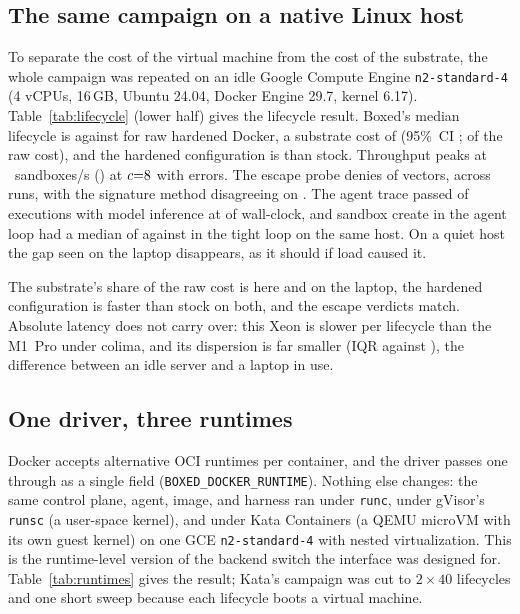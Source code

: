 \documentclass[conference]{IEEEtran}
\begin{document}
\subsection{The same campaign on a native Linux host}\label{sec:linux}
To separate the cost of the virtual machine from the cost of the substrate,
the whole campaign was repeated on an idle Google Compute Engine
\texttt{n2-standard-4} (4 vCPUs, 16\,GB, Ubuntu 24.04, Docker Engine 29.7,
kernel 6.17).
Table~\ref{tab:lifecycle} (lower half) gives the lifecycle result. Boxed's median
lifecycle is \LinuxBoxedColdMedian{} against \LinuxBaseHardMedian{} for raw
hardened Docker, a substrate cost of \LinuxBoxedOverheadMedian{} (95\%~CI
\LinuxBoxedOverheadCI; \LinuxBoxedOverheadPct{} of the raw cost), and the
hardened configuration is \LinuxHardeningDeltaMedian{}
\LinuxHardeningDeltaSign{} than stock. Throughput peaks at
\LinuxBoxedPeakRPS{}~sandboxes/s (\LinuxBoxedPeakCI) at
$c{=}8$ with \LinuxBoxedTPErrors{} errors. The escape
probe denies \LinuxBoxedEscapeDenied{} of \LinuxBoxedEscapeTotal{} vectors,
\LinuxBoxedEscapeConsistent{} across \LinuxBoxedEscapeRuns{} runs, with the
signature method disagreeing on \LinuxBoxedEscapeSigDisagree{}. The agent
trace passed \LinuxBoxedAgentPassCount{} of \LinuxBoxedAgentN{} executions
with model inference at \LinuxBoxedAgentLLMShare{} of wall-clock, and
sandbox create in the agent loop had a median of
\LinuxBoxedAgentCreateMedian{} against \LinuxBoxedColdCreateMedian{} in
the tight loop on the same host. On a quiet host the gap seen on the laptop
disappears, as it should if load caused it.

The substrate's share of the raw cost is \LinuxBoxedOverheadPct{} here and
\BoxedOverheadPct{} on the laptop, the hardened configuration is faster
than stock on both, and the escape verdicts match. Absolute latency does
not carry over: this Xeon is slower per lifecycle than the M1~Pro under
colima, and its dispersion is far smaller (IQR \LinuxBoxedColdIQR{} against
\BoxedColdIQR), the difference between an idle server and a laptop in use.

\subsection{One driver, three runtimes}\label{sec:runtimes}
Docker accepts alternative OCI runtimes per container, and the driver passes
one through as a single field (\texttt{BOXED\_DOCKER\_RUNTIME}). Nothing
else changes: the same control plane, agent, image, and harness ran under
\texttt{runc}, under gVisor's \texttt{runsc} (a user-space kernel), and
under Kata Containers (a QEMU microVM with its own guest kernel) on one GCE
\texttt{n2-standard-4} with nested virtualization. This is the runtime-level
version of the backend switch the interface was designed for.
Table~\ref{tab:runtimes} gives the result; Kata's campaign was cut to
$2\times40$ lifecycles and one short sweep because each lifecycle boots a
virtual machine.
\end{document}
